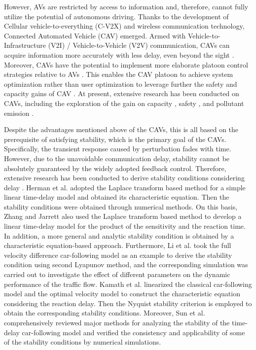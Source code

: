 \documentclass[a4paper]{cas-sc}
\begin{document}
However, AVs are restricted by access to information and, therefore, cannot fully utilize the potential of autonomous driving. Thanks to the development of Cellular vehicle-to-everything (C-V2X) and wireless communication technology, Connected Automated Vehicle (CAV) emerged. Armed with Vehicle-to-Infrastructure (V2I) / Vehicle-to-Vehicle (V2V) communication, CAVs can acquire information more accurately with less delay, even beyond the sight \citep{Navas2019,Zhou2021}. Moreover, CAVs have the potential to implement more elaborate platoon control strategies relative to AVs \citep{Dey2015,zheng_stability_2015}. This enables the CAV platoon to achieve system optimization rather than user optimization to leverage further the safety and capacity gains of CAV \citep{Ghiasi2017,li_deployment_2020}. At present, extensive research has been conducted on CAVs, including the exploration of the gain on capacity \citep{sala_capacity_2021,Chang2020}, safety \citep{Zhou2019,Montanino2021,yu2021investigating}, and pollutant emission \citep{liu2018impact,xiao2018unravelling}.


Despite the advantages mentioned above of the CAVs, this is all based on the prerequisite of satisfying stability, which is the primary goal of the CAVs. Specifically, the transient response caused by perturbation fades with time. However, due to the unavoidable communication delay, stability cannot be absolutely guaranteed by the widely adopted feedback control. Therefore, extensive research has been conducted to derive stability conditions considering delay \citep{herman1959traffic,zhang1997stability,li2010lyapunov,li2013stability,kamath2015car,sun_stability_2018}. Herman et al. \citep{herman1959traffic} adopted the Laplace transform based method for a simple linear time-delay model and obtained its characteristic equation. Then the stability conditions were obtained through numerical methods. On this basis, Zhang and Jarrett \citep{zhang1997stability} also used the Laplace transform based method to develop a linear time-delay model for the product of the sensitivity and the reaction time. In addition, a more general and analytic stability condition is obtained by a characteristic equation-based approach. Furthermore, Li et al. \citep{li2010lyapunov,li2013stability} took the full velocity difference car-following model as an example to derive the stability condition using second Lyapunov method, and the corresponding simulation was carried out to investigate the effect of different parameters on the dynamic performance of the traffic flow. Kamath et al. \citep{kamath2015car} linearized the classical car-following model and the optimal velocity model to construct the characteristic equation considering the reaction delay. Then the Nyquist stability criterion is employed to obtain the corresponding stability conditions. Moreover, Sun et al. \citep{sun_stability_2018} comprehensively reviewed major methods for analyzing the stability of the time-delay car-following model and verified the consistency and applicability of some of the stability conditions by numerical simulations.
\end{document}
